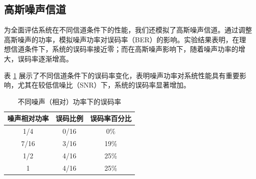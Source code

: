\subsection{高斯噪声信道}

为全面评估系统在不同信道条件下的性能，我们还模拟了高斯噪声信道。通过调整高斯噪声的功率，模拟噪声功率对误码率（BER）的影响。实验结果表明，在理想信道条件下，系统的误码率接近零；而在高斯噪声影响下，随着噪声功率的增大，误码率逐渐增高。

表 \ref{tab:ber_results} 展示了不同信道条件下的误码率变化，表明噪声功率对系统性能具有重要影响，尤其在较低信噪比（SNR）下，系统的误码率显著增加。

\begin{table}[h!]
    \begin{center}
        \begin{tabular}{c|c|c}
        \hline
        \textbf{噪声相对功率} & \textbf{误码比例} & \textbf{误码率百分比}\\
        \hline
        1/4 & 0/16 & 0\%\\
        7/16 &  3/16 & 19\%\\
        1/2 & 4/16 & 25\%\\
        1 & 4/16 & 25\% \\ \hline
        \end{tabular}
        \caption{不同噪声（相对）功率下的误码率}\label{tab:ber_results}
    \end{center}
\end{table}
